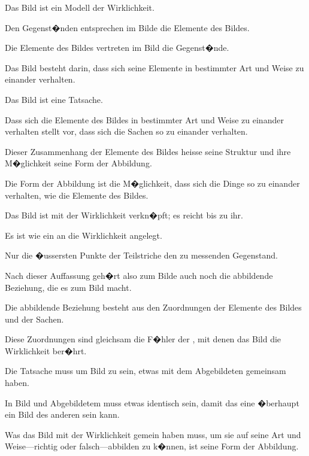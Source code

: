 \begin{propositions}
{Das Bild ist ein Modell der Wirklichkeit.}


{Den Gegenst�nden entsprechen im Bilde die
Elemente des Bildes.}


{Die Elemente des Bildes vertreten im Bild die
Gegenst�nde.}


{Das Bild besteht darin, dass sich seine Elemente
in bestimmter Art und Weise zu einander verhalten.}


{Das Bild ist eine Tatsache.}


{Dass sich die Elemente des Bildes in bestimmter
Art und Weise zu einander verhalten stellt vor,
dass sich die Sachen so zu einander verhalten.

Dieser Zusammenhang der Elemente des Bildes
heisse seine Struktur und ihre M�glichkeit seine
Form der Abbildung.}


{Die Form der Abbildung ist die M�glichkeit,
dass sich die Dinge so zu einander verhalten, wie
die Elemente des Bildes.}


{Das Bild ist  mit der Wirklichkeit verkn�pft;
es reicht bis zu ihr.}


{Es ist wie ein  an die Wirklichkeit
angelegt.}


{Nur die �ussersten Punkte der Teilstriche
 den zu messenden Gegenstand.}


{Nach dieser Auffassung geh�rt also zum Bilde
auch noch die abbildende Beziehung, die es zum
Bild macht.}


{Die abbildende Beziehung besteht aus den
Zuordnungen der Elemente des Bildes und der
Sachen.}


{Diese Zuordnungen sind gleichsam die F�hler
der , mit denen das Bild die Wirklichkeit
ber�hrt.}


{Die Tatsache muss um Bild zu sein, etwas mit
dem Abgebildeten gemeinsam haben.}


{In Bild und Abgebildetem muss etwas identisch
sein, damit das eine �berhaupt ein Bild des anderen
sein kann.}


{Was das Bild mit der Wirklichkeit gemein
haben muss, um sie auf seine Art und Weise---richtig
oder falsch---abbilden zu k�nnen, ist seine
Form der Abbildung.}



\end{propositions}
